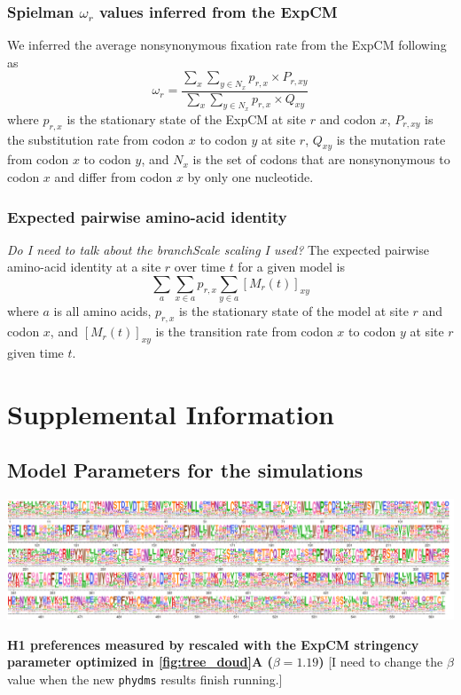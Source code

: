 \documentclass[11pt]{article}
\newcommand\skhcomment[1]{{\color{cyan}[#1]}}
\begin{document}
\subsubsection*{Spielman $\omega_{r}$ values inferred from the ExpCM} 
We inferred the average nonsynonymous fixation rate from the ExpCM following~\citet{spielman2015relationship} as 
\begin{equation}
\label{eq:w_r}
\omega_{r} = \frac{\sum_{x} \sum_{y \in N_x} {p_{r,x} \times P_{r,xy}}}{\sum_{x} \sum_{y \in N_x} {p_{r,x} \times Q_{xy}}}
\end{equation}
where $p_{r,x}$ is the stationary state of the ExpCM at site $r$ and codon $x$, $P_{r,xy}$ is the substitution rate from codon $x$ to codon $y$ at site $r$, $Q_{xy}$ is the mutation rate from codon $x$ to codon $y$, and $N_x$ is the set of codons that are nonsynonymous to codon $x$ and differ from codon $x$ by only one nucleotide. 

\subsubsection*{Expected pairwise amino-acid identity}
\textit{Do I need to talk about the branchScale scaling I used?}
The expected pairwise amino-acid identity at a site $r$ over time $t$ for a given model is 
\begin{equation}
\label{eq:f}
\sum_a \sum_{x \in a} p_{r,x} \sum_{y \in a} [M_{r}\left(t\right)]_{xy}
\end{equation}
where $a$ is all amino acids, $p_{r,x}$ is the stationary state of the model at site $r$ and codon $x$, and $[M_{r}\left(t\right)]_{xy}$ is the transition rate from codon $x$ to codon $y$ at site $r$ given time $t$. 

\newpage
\section*{Supplemental Information}

\subsection*{Model Parameters for the simulations}

\begin{suppfig}[H]
\centerline{\includegraphics[width=\textwidth]{figures/prefs_doud}}
\caption{\label{suppfig:prefs_doud}
\textbf{H1 preferences measured by \cite{doud2016accurate} rescaled with the ExpCM stringency parameter optimized in \ref{fig:tree_doud}A  ($\beta = 1.19$)} 
\skhcomment{I need to change the $\beta$ value when the new \texttt{phydms} results finish running.}
}
\end{suppfig}
\end{document}
